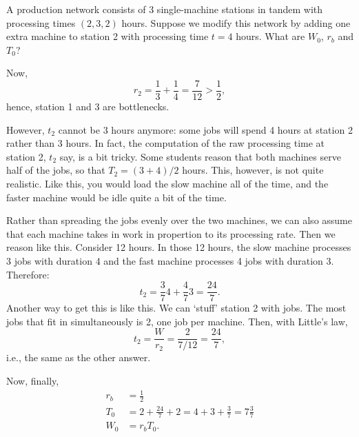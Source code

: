 \begin{question}
  A production network consists of 3 single-machine stations in tandem
  with processing times $(2, 3, 2)$ hours.  Suppose we modify this
  network by adding one extra machine to station 2 with
  processing time $t=4$ hours.  What are $W_0$, $r_b$ and $T_0$?

\begin{solution}
Now, 
\begin{equation*}
  r_2 = \frac13 + \frac 14 = \frac 7{12} > \frac12,
\end{equation*}
hence, station 1 and 3 are bottlenecks. 


However, $t_2$ cannot be $3$ hours anymore: some jobs will spend 4
hours at station 2 rather than 3 hours. In fact, the computation of
the raw processing time at station 2, $t_2$ say, is a bit tricky. Some
students reason that both machines serve half of the jobs, so that
$T_2=(3+4)/2$ hours.  This, however, is not quite realistic. Like
this, you would load the slow machine all of the time, and the faster
machine would be idle quite a bit of the time. 


  Rather than spreading the jobs evenly over the two machines, we can
  also assume that each machine takes in work in propertion to its
  processing rate.  Then we reason like this. Consider 12 hours. In
  those 12 hours, the slow machine processes 3 jobs with duration 4
  and the fast machine processes 4 jobs with duration 3. Therefore:
  \begin{equation*}
    t_2 = \frac 3 7 4 + \frac 4 7 3 = \frac{24}7.
  \end{equation*}
  Another way to get this is like this. We can `stuff' station 2 with
  jobs. The most jobs that fit in simultaneously is 2, one job per
  machine. Then, with Little's law,
  \begin{equation*}
   t_2 = \frac{W}{r_2} = \frac{2}{7/12} = \frac{24}7,
  \end{equation*}
i.e., the same as the other answer.

Now, finally, 
    \begin{align*}
      r_b &= \frac12 \\
      T_0 &= 2 + \frac{24}7 + 2 = 4 + 3 + \frac37 = 7 \frac37\\
      W_0 &= r_b T_0.
    \end{align*}


\end{solution}
\end{question}
